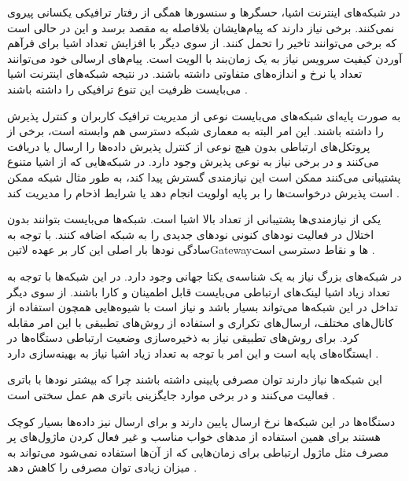 
در شبکه‌های اینترنت اشیا، حسگرها و سنسورها همگی از رفتار ترافیکی یکسانی پیروی نمی‌کنند. برخی نیاز دارند که پیام‌هایشان بلافاصله به مقصد برسد و این در حالی است که برخی می‌توانند تاخیر را تحمل کنند.
از سوی دیگر با افزایش تعداد اشیا برای فرآهم آوردن کیفیت سرویس نیاز به یک زمان‌بند با الویت است. پیام‌های ارسالی خود می‌توانند تعداد یا نرخ و اندازه‌های متفاوتی داشته باشند.
در نتیجه شبکه‌های اینترنت اشیا می‌بایست ظرفیت این تنوع ترافیکی را داشته باشند
.

به صورت پایه‌ای شبکه‌های می‌بایست نوعی از مدیریت ترافیک کاربران و کنترل پذیرش را داشته باشند.
این امر البته به معماری شبکه دسترسی هم وابسته است، برخی از پروتکل‌های ارتباطی بدون هیچ نوعی از کنترل پذیرش
داده‌ها را ارسال یا دریافت می‌کنند و در برخی نیاز به نوعی پذیرش وجود دارد.
در شبکه‌هایی که از اشیا متنوع پشتیبانی می‌کنند ممکن است این نیازمندی گسترش پیدا کند، به طور مثال
شبکه ممکن است پذیرش درخواست‌ها را بر پایه اولویت انجام دهد یا شرایط اذحام را مدیریت کند
.


یکی از نیازمندی‌ها پشتیبانی از تعداد بالا اشیا است. شبکه‌ها می‌بایست بتوانند بدون اختلال در فعالیت نودهای کنونی نودهای جدیدی را به شبکه اضافه کنند.
با توجه به سادگی نودها بار اصلی این کار بر عهده ‌لاتین{Gateway}ها و نقاط دسترسی است
.

در شبکه‌های بزرگ نیاز به یک شناسه‌ی یکتا جهانی وجود دارد.
در این شبکه‌ها با توجه به تعداد زیاد اشیا لینک‌های ارتباطی می‌بایست قابل اطمینان و کارا باشند.
از سوی دیگر تداخل در این شبکه‌ها می‌تواند بسیار باشد و نیاز است با شیوه‌هایی همچون استفاده از کانال‌های مختلف،
ارسال‌های تکراری و استفاده از روش‌های تطبیقی با این امر مقابله کرد.
برای روش‌های تطبیقی نیاز به ذخیره‌سازی وضعیت ارتباطی دستگاه‌ها در ایستگاه‌های پایه است و این امر با توجه به تعداد زیاد
اشیا نیاز به بهینه‌سازی دارد
.


این شبکه‌ها نیاز دارند توان مصرفی پایینی داشته باشند چرا که بیشتر نودها با باتری فعالیت می‌کنند
و در برخی موارد جایگزینی باتری هم عمل سختی است
.

دستگاه‌ها در این شبکه‌ها نرخ ارسال پایین دارند و برای ارسال نیز داده‌ها بسیار کوچک هستند
برای همین استفاده از مدهای خواب مناسب و غیر فعال کردن ماژول‌های پر مصرف مثل ماژول
ارتباطی برای زمان‌هایی که از آن‌ها استفاده نمی‌شود می‌تواند به میزان زیادی توان مصرفی را کاهش دهد
.

